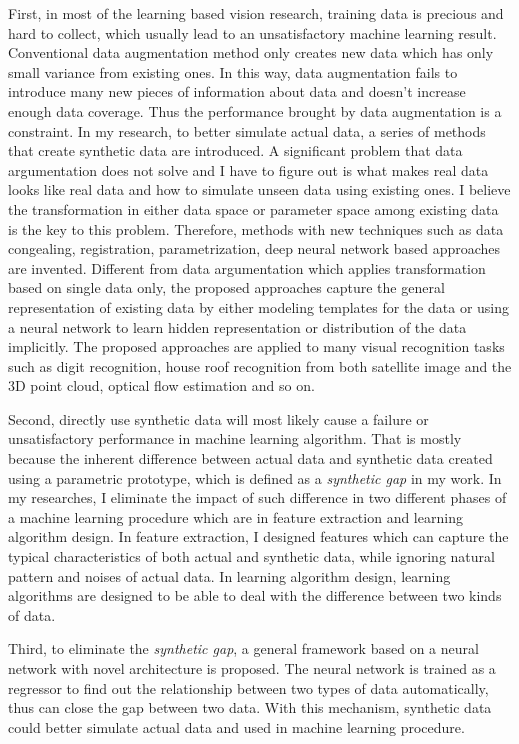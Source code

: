 \documentclass{iitthesis}
\begin{document}
First, in most of the learning based vision research, training data is precious and hard to collect, which usually lead to an unsatisfactory machine learning result. Conventional data augmentation method only creates
new data which has only small variance from existing ones. In this way, data augmentation fails to introduce many new pieces of information about data and doesn't increase enough data coverage. Thus the performance brought by data augmentation is a constraint. In my research, to better simulate actual data, a series of methods that create synthetic data are introduced. A significant problem that data argumentation does not solve and I have to figure out is what makes real data looks like real data and how to simulate unseen data using existing ones. I believe the transformation in either data space or parameter space among existing data is the key to this problem. Therefore, methods with new techniques such as data congealing, registration, parametrization, deep neural network based approaches
are invented. Different from data argumentation which applies transformation based on single data only, the proposed approaches capture the general representation of existing data by either modeling templates for the data or using a neural network to learn hidden representation or distribution of the data implicitly. The proposed approaches are applied to many visual recognition tasks such as digit recognition, house roof recognition from both satellite image and the 3D point cloud, optical flow estimation and so on.

Second, directly use synthetic data will most likely cause a failure or unsatisfactory performance in machine learning algorithm. That is mostly because the inherent difference between actual data and synthetic data created using a parametric prototype, which is defined as a \textit{synthetic gap} in my work. In my researches, I eliminate the impact of such difference in two different phases of a machine learning procedure which are in feature extraction and learning algorithm design. In feature extraction, I designed features which can capture the typical characteristics of both actual and synthetic data, while ignoring natural pattern and noises of actual data. In learning algorithm design, learning algorithms are designed to be able to deal with the difference between two kinds of data. 

Third, to eliminate the \textit{synthetic gap}, a general framework based on a neural network with novel architecture is proposed. The neural network is trained as a regressor to find out the relationship between two types of data automatically, thus can close the gap between two data. With this mechanism, synthetic data could better simulate actual data and used in machine learning procedure.
\end{document}
